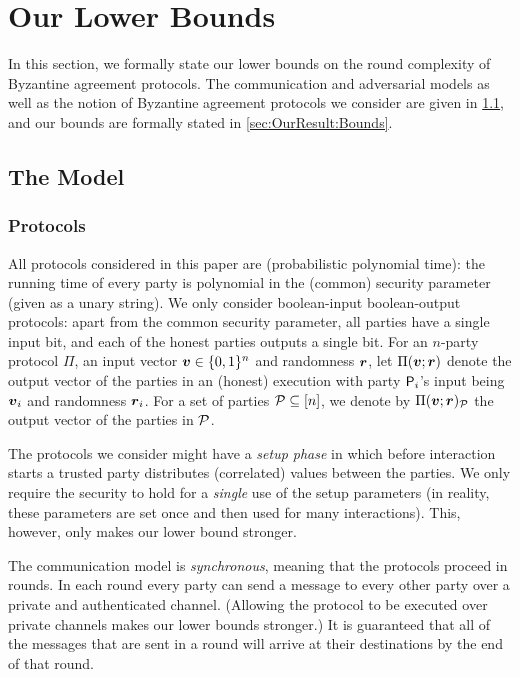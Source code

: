 \section{Our Lower Bounds}\label{sec:OurResult}

In this section, we formally state our lower bounds on the round complexity of Byzantine agreement protocols. The communication and adversarial models as well as the notion of Byzantine agreement protocols we consider are given in \cref{sec:OurResults:Model}, and our bounds are formally stated in \cref{sec:OurResult:Bounds}.

\subsection{The Model}\label{sec:OurResults:Model}

\subsubsection{Protocols}
All protocols considered in this paper are \ppt (probabilistic polynomial time): the running time of every party is polynomial in the (common) security parameter (given as a unary string). We only consider boolean-input boolean-output protocols: apart from the common security parameter, all parties have a single input bit, and each of the honest parties outputs a single bit. For an $n$-party protocol $\Pi$, an input vector ${ \boldsymbol{v}}\in {\{0,1\}^n}$ and randomness ${ \boldsymbol{r}}$, let $\Pi({ \boldsymbol{v}}; { \boldsymbol{r}})$ denote the output vector of the parties in an (honest) execution with party $\mathsf{P}_i$'s input being ${ \boldsymbol{v}}_i$ and randomness ${ \boldsymbol{r}}_i$.
For a set of parties $\mathcal{P} \subseteq [n]$, we denote by $\Pi({ \boldsymbol{v}}; { \boldsymbol{r}})_{\mathcal{P}}$ the output vector of the parties in $\mathcal{P}$.

The protocols we consider might have a \emph{setup phase} in which before interaction starts a trusted party distributes (correlated) values between the parties. We only require the security to hold for a \emph{single} use of the setup parameters (in reality, these parameters are set once and then used for many interactions). This, however, only makes our lower bound stronger.

The communication model is \emph{synchronous}, meaning that the protocols proceed in rounds. In each round every party can send a message to every other party over a private and authenticated channel. (Allowing the protocol to be executed over private channels makes our lower bounds stronger.) It is guaranteed that all of the messages that are sent in a round will arrive at their destinations by the end of that round.

